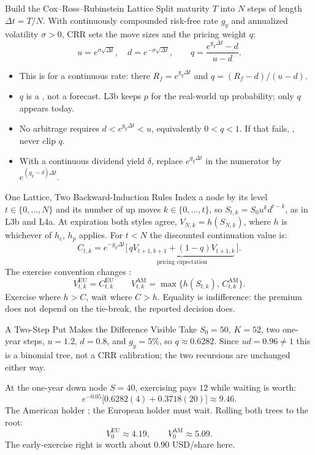 \documentclass[aspectratio=169,11pt]{beamer}
\newcommand{\gy}{g_y}
\newcommand{\dt}{\Delta t}
\newcommand{\AM}{\mathrm{AM}}
\newcommand{\EU}{\mathrm{EU}}
\begin{document}
\begin{frame}{Build the Cox--Ross--Rubinstein Lattice}
  Split maturity $T$ into $N$ steps of length $\dt=T/N$. With continuously
  compounded risk-free rate $\gy$ and annualized volatility $\sigma>0$, CRR sets
  the move sizes and the pricing weight $q$:
  \[
    u=e^{\sigma\sqrt{\dt}},\quad d=e^{-\sigma\sqrt{\dt}},
    \qquad
    \boxed{q=\frac{e^{\gy\dt}-d}{u-d}.}
  \]
  \begin{itemize}\setlength{\itemsep}{0.25em}
    \item This is  for a continuous rate: there
      $R_f=e^{\gy\dt}$ and $q=(R_f-d)/(u-d)$.
    \item $q$ is a , not a forecast. L3b keeps $p$ for the
      real-world up probability; only $q$ appears today.
    \item No arbitrage requires $d<e^{\gy\dt}<u$, equivalently $0<q<1$. If that
      fails, , never clip $q$.
    \item With a continuous dividend yield $\delta$, replace $e^{\gy\dt}$ in the
      numerator by $e^{(\gy-\delta)\dt}$.
  \end{itemize}
\end{frame}

\begin{frame}{One Lattice, Two Backward-Induction Rules}
  Index a node by its level $t\in\{0,\dots,N\}$ and its number of up moves
  $k\in\{0,\dots,t\}$, so $S_{t,k}=S_0u^kd^{t-k}$, as in L3b and L4a. At
  expiration both styles agree, $V_{N,k}=h(S_{N,k})$, where $h$ is whichever of
  $h_c$, $h_p$ applies. For $t<N$ the discounted continuation value is:
  \[
    C_{t,k}=e^{-\gy\dt}\bigl[\,\underbrace{qV_{t+1,k+1}+(1-q)V_{t+1,k}}_{\text{pricing expectation}}\,\bigr].
  \]
  The exercise convention changes :
  \[
    \boxed{V^{\EU}_{t,k}=C^{\EU}_{t,k}}
    \qquad
    \boxed{V^{\AM}_{t,k}=\max\bigl\{h(S_{t,k}),\,C^{\AM}_{t,k}\bigr\}.}
  \]
  Exercise where $h>C$, wait where $C>h$. Equality is indifference: the premium
  does not depend on the tie-break, the reported decision does.
\end{frame}

\begin{frame}{A Two-Step Put Makes the Difference Visible}
  Take $S_0=50$, $K=52$, two one-year steps, $u=1.2$, $d=0.8$, and $\gy=5\%$, so
  $q\approx0.6282$. Since $ud=0.96\neq1$ this is a  binomial
  tree, not a CRR calibration; the two recursions are unchanged either way.

  \vspace{0.4em}
  At the one-year down node $S=40$, exercising pays $12$ while waiting is worth:
  \[
    e^{-0.05}\bigl[0.6282(4)+0.3718(20)\bigr]\approx9.46.
  \]
  The American holder ; the European holder must wait. Rolling
  both trees to the root:
  \[
    \boxed{V_0^{\EU}\approx4.19,\qquad V_0^{\AM}\approx5.09.}
  \]
  The early-exercise right is worth about $0.90$ USD/share here.
\end{frame}
\end{document}
